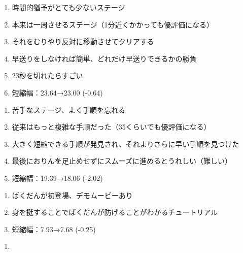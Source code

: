 \begin{enumerate}[label={\sarrow}]
\item 時間的猶予がとても少ないステージ
\item 本来は一周させるステージ（1分近くかかっても優評価になる）
\item それをむりやり反対に移動させてクリアする
\item 早送りをしなければ簡単、どれだけ早送りできるかの勝負
\item 23秒を切れたらすごい
\item 短縮幅：23.64→23.00 (-0.64)
\end{enumerate}



\begin{enumerate}[label={\sarrow}]
\item 苦手なステージ、よく手順を忘れる
\item 従来はもっと複雑な手順だった（35くらいでも優評価になる）
\item 大きく短縮できる手順が発見され、それよりさらに早い手順を見つけた
\item 最後におりんを足止めせずにスムーズに進めるとうれしい（難しい）
\item 短縮幅：19.39→18.06 (-2.02)
\end{enumerate}



\begin{enumerate}[label={\sarrow}]
\item ばくだんが初登場、デモムービーあり
\item 身を挺することでばくだんが防げることがわかるチュートリアル
\item 短縮幅：7.93→7.68 (-0.25)
\end{enumerate}



\begin{enumerate}[label={\sarrow}]
\item
\end{enumerate}



